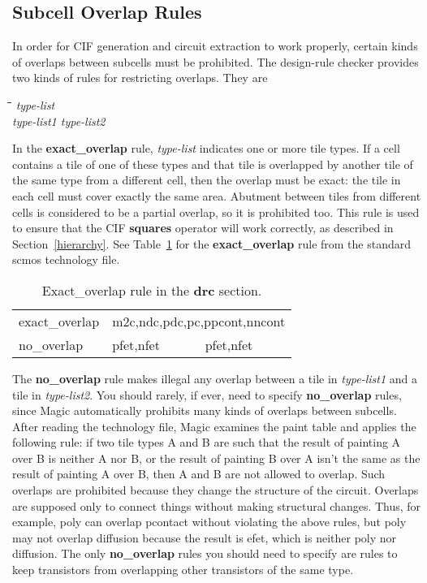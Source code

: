 \documentclass[letterpaper,twoside,12pt]{article}
\def\hinch{\hspace*{0.5in}}
\def\starti{\begin{center}\begin{tabbing}\hinch\=\hinch\=\hinch\=\hinch\=\kill}
\def\endi{\end{tabbing}\end{center}}
\def\ii{\>\>\>}
\begin{document}
\subsection{Subcell Overlap Rules}

In order for CIF generation and circuit extraction to work properly,
certain kinds of overlaps between subcells must be prohibited.  The
design-rule checker provides two kinds of rules for restricting
overlaps.  They are

\starti
   \ii {\bfseries exact{\_}overlap} {\itshape type-list} \\
   \ii {\bfseries no{\_}overlap} {\itshape type-list1 type-list2}
\endi

In the {\bfseries exact{\_}overlap} rule, {\itshape type-list}
indicates one or more tile types.
If a cell contains a tile of one of these types and that tile is
overlapped by another tile of the same type from a different cell,
then the overlap must be exact:  the tile in each cell must cover
exactly the same area.  Abutment between tiles from different cells
is considered to be a partial overlap, so it is prohibited too.
This rule is used to ensure that the CIF {\bfseries squares} operator
will work correctly, as described in Section~\ref{hierarchy}.
See Table~\ref{exactoverlap} for the {\bfseries exact{\_}overlap}
rule from the standard scmos technology file.

\begin{table}[ht]
   \begin{center}
      \begin{tabular}{|lll|} \hline
	 exact{\_}overlap & \multicolumn{2}{l|}{m2c,ndc,pdc,pc,ppcont,nncont} \\
	 no{\_}overlap	  & pfet,nfet & pfet,nfet \\ \hline
      \end{tabular}
      \caption{Exact{\_}overlap rule in the {\bfseries drc} section.}
      \label{exactoverlap}
   \end{center}
\end{table}

The {\bfseries no{\_}overlap} rule makes illegal any overlap between a tile in
{\itshape type-list1} and a tile in {\itshape type-list2}.  You should rarely,
if ever, need to specify {\bfseries no{\_}overlap} rules, since
Magic automatically prohibits many kinds of overlaps between
subcells.  After reading the technology file, Magic examines the paint
table and applies the following rule:  if two tile types A and
B are such that the result of painting A over B
is neither A nor B, or the result of painting B over A isn't
the same as the result of painting A over B, then A and B
are not allowed to overlap.
Such overlaps are prohibited because they change the
structure of the circuit.  Overlaps are supposed only to connect
things without making structural changes.  Thus, for example, poly can
overlap pcontact without violating the above rules, but
poly may not overlap diffusion because the result is efet, which
is neither poly nor diffusion.  The only {\bfseries no{\_}overlap} rules
you should need to specify are rules to keep transistors from
overlapping other transistors of the same type.
\end{document}
